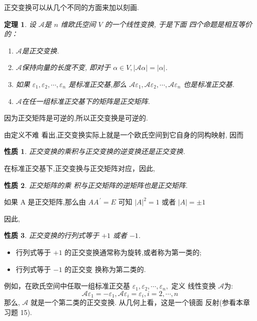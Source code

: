 \documentclass[13pt]{beamer}
\newtheorem{thm}{定理}
\newtheorem*{prop}{性质}
\begin{document}
\begin{frame}
正交变换可以从几个不同的方面来加以刻画.  

\begin{thm}
设 $\mathscr{A}$是 $n$ 维欧氏空间 $V$ 的一个线性变换, 于是下面 四个命题是相互等价的：
\begin{enumerate}
	\item $\mathscr{A}$是正交变换.
	\item $\mathscr{A}$保持向量的长度不变, 即对于 ${\alpha} \in V,|\mathscr{A} {\alpha}|=| {\alpha} |$.
	\item 如果 ${\varepsilon}_{1}, {\varepsilon}_{2}, \cdots, {\varepsilon}_{n}$ 是标准正交基,那么 $\mathscr{A} {\varepsilon}_{1}, \mathscr{A} {\varepsilon}_{2}, \cdots, \mathscr{A}{\varepsilon}_{n}$
	也是标准正交基.
	\item $\mathscr{A}$在任一组标准正交基下的矩阵是正交矩阵.
\end{enumerate}
\end{thm}

\end{frame}

\begin{frame}
因为正交矩阵是可逆的,所以正交变换是可逆的.

由定义不难 看出,正交变换实际上就是一个欧氏空间到它自身的同构映射, 因而
\begin{prop}
正交变换的乘积与正交变换的逆变换还是正交变换. 
\end{prop}


 在标准正交基下,正交变换与正交矩阵对应，因此,
\begin{prop}
正交矩阵的乘 积与正交矩阵的逆矩阵也是正交矩阵.  
\end{prop}
\end{frame}

\begin{frame}
如果 A 是正交矩阵,那么由
$
{A A}^{\, \prime}={E}
$
可知
$
|{A}|^{2}=1 \text { 或者 }|{A}|=\pm 1
$

因此,
\begin{prop}
正交变换的行列式等于 $+ 1$ 或者 $- 1$.
\end{prop}

\begin{itemize}
\item 行列式等于 $+1$ 的正交变换通常称为旋转,或者称为\alert{第一类}的;
\item 行列式等于 $- 1$ 的正交变 换称为\alert{第二类}的.  
\end{itemize}



例如，在欧氏空间中任取一组标准正交基 ${\varepsilon}_{1}, {\varepsilon}_{2}, \cdots, {\varepsilon}_{n},$ 定义
线性变换 $\mathscr{A}$为:
\[
\mathscr{A} {\varepsilon}_{1}=-{\varepsilon}_{1}, \mathscr{A} {\varepsilon}_{i}={\varepsilon}_{i}, i=2, \cdots, {n}
\]
那么, $\mathscr{A}$ 就是一个第二类的正交变换. 从几何上看，这是一个镜面 反射(参看本章习题 15). 
\end{frame}
\end{document}
